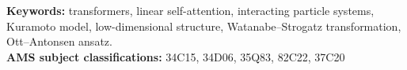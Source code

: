 \documentclass[10pt]{article}
\theoremstyle{definition}
\theoremstyle{definition}
\numberwithin{equation}{section}
\begin{document}

{\noindent\small{\textbf{Keywords:} transformers, linear self-attention, interacting particle systems, Kuramoto model, low-dimensional structure, Watanabe--Strogatz transformation, Ott--Antonsen ansatz}.}\\

{\noindent\small{\textbf{AMS subject classifications:} {34C15, 34D06, 35Q83, 82C22, 37C20}}}

%
%
\end{document}
